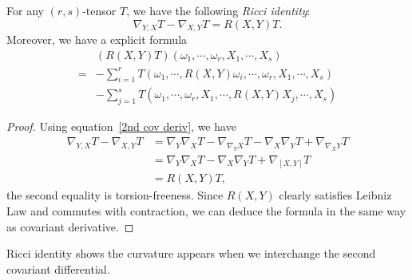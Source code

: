 \begin{prop}
    For any $(r,s)$-tensor $T$, we have the following \emph{Ricci identity}:
    \[\nabla_{Y,X}T-\nabla_{X,Y}T=R(X,Y)T.\]
    Moreover, we have a explicit formula
    \begin{equation}
        \begin{aligned}
            &(R(X,Y)T)(\omega_1,\cdots,\omega_r,X_1,\cdots,X_s)\\
            =&-\sum_{i=1}^rT(\omega_1,\cdots,R(X,Y)\omega_i,\cdots,\omega_r,X_1,\cdots,X_s)\\
            &-\sum_{j=1}^sT(\omega_1,\cdots,\omega_r,X_1,\cdots,R(X,Y)X_j,\cdots,X_s)
        \end{aligned}\label{curvature formula}
    \end{equation}
\end{prop}
\begin{proof}
    Using equation~\eqref{2nd cov deriv}, we have
    \begin{align*}
        \nabla_{Y,X}T-\nabla_{X,Y}T&=\nabla_Y\nabla_XT-\nabla_{\nabla_YX}T-\nabla_X\nabla_YT+\nabla_{\nabla_XY}T\\
        &=\nabla_Y\nabla_XT-\nabla_X\nabla_YT+\nabla_{[X,Y]}T\\
        &=R(X,Y)T,
    \end{align*}
    the second equality is torsion-freeness.
    Since $R(X,Y)$ clearly satisfies Leibniz Law and commutes with contraction, we can deduce the formula in the same way as covariant derivative.
\end{proof}

Ricci identity shows the curvature appears when we interchange the second covariant differential.

